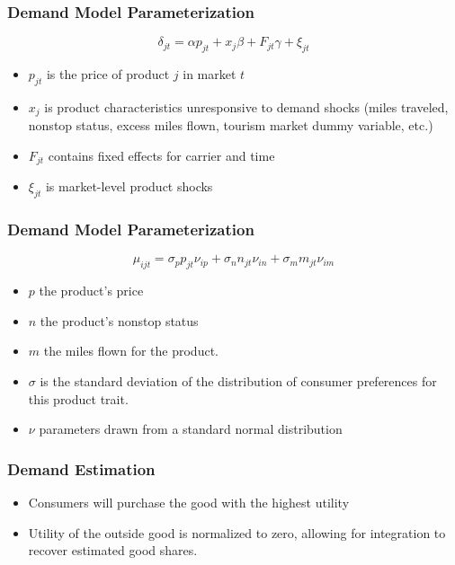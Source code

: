 \documentclass[xcolor=dvipsnames]{beamer}
\begin{document}
    \begin{frame}
        \frametitle{Demand Model Parameterization}
        \[\delta_{jt} = \alpha p_{jt} + x_{j} \beta + F_{jt}\gamma  +  \xi_{jt}\]
         \vspace{-8mm}
        \begin{itemize}
            \item $p_{jt}$ is the price of product $j$ in market $t$
            \item $x_j$ is product characteristics unresponsive to demand shocks (miles traveled, nonstop status, excess miles flown, tourism market dummy variable, etc.)
            \item $F_{jt}$ contains fixed effects for carrier and time
            \item $\xi_{jt}$ is market-level product shocks
        \end{itemize}
    \end{frame}

    \begin{frame}
        \frametitle{Demand Model Parameterization}
             \[\mu_{ijt} = \sigma_{p} p_{jt} \nu_{ip} + \sigma_{n} n_{jt} \nu_{in} + \sigma_{m} m_{jt} \nu_{im} \] 
             \vspace{-8mm}
            \begin{itemize}
                \item $p$ the product's price
                \item $n$ the product's nonstop status
                \item $m$ the miles flown for the product.
                \item $\sigma$ is the standard deviation of the distribution of consumer preferences for this product trait. 
                \item $\nu$ parameters drawn from a standard normal distribution 
            \end{itemize}
    \end{frame}

    \begin{frame}
        \frametitle{Demand Estimation}
        \begin{itemize}
            \item Consumers will purchase the good with the highest utility
            \item Utility of the outside good is normalized to zero, allowing for integration to recover estimated good shares.
        \end{itemize}
    \end{frame}
\end{document}
